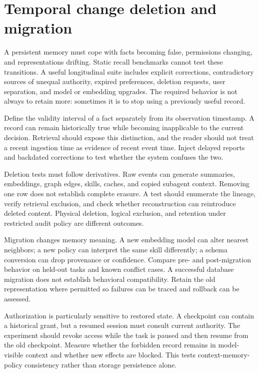 \section{Temporal change deletion and migration}\label{sec:C27:change}
A persistent memory must cope with facts becoming false, permissions changing, and representations drifting. Static recall benchmarks cannot test these transitions. A useful longitudinal suite includes explicit corrections, contradictory sources of unequal authority, expired preferences, deletion requests, user separation, and model or embedding upgrades. The required behavior is not always to retain more: sometimes it is to stop using a previously useful record.

Define the validity interval of a fact separately from its observation timestamp. A record can remain historically true while becoming inapplicable to the current decision. Retrieval should expose this distinction, and the reader should not treat a recent ingestion time as evidence of recent event time. Inject delayed reports and backdated corrections to test whether the system confuses the two.

Deletion tests must follow derivatives. Raw events can generate summaries, embeddings, graph edges, skills, caches, and copied subagent context. Removing one row does not establish complete erasure. A test should enumerate the lineage, verify retrieval exclusion, and check whether reconstruction can reintroduce deleted content. Physical deletion, logical exclusion, and retention under restricted audit policy are different outcomes.

Migration changes memory meaning. A new embedding model can alter nearest neighbors; a new policy can interpret the same skill differently; a schema conversion can drop provenance or confidence. Compare pre- and post-migration behavior on held-out tasks and known conflict cases. A successful database migration does not establish behavioral compatibility. Retain the old representation where permitted so failures can be traced and rollback can be assessed.

Authorization is particularly sensitive to restored state. A checkpoint can contain a historical grant, but a resumed session must consult current authority. The experiment should revoke access while the task is paused and then resume from the old checkpoint. Measure whether the forbidden record remains in model-visible context and whether new effects are blocked. This tests context-memory-policy consistency rather than storage persistence alone.

